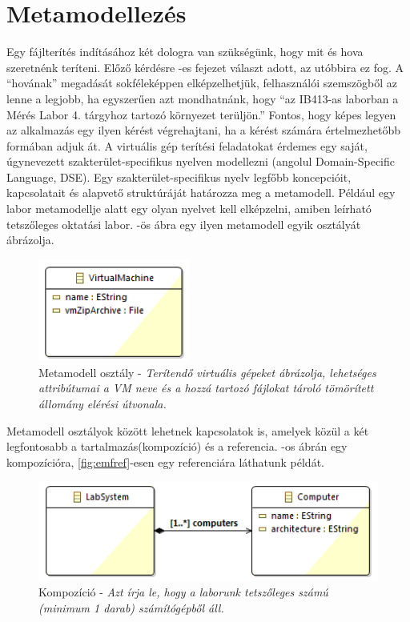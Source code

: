 \section{Metamodellezés}
Egy fájlterítés indításához két dologra van szükségünk, hogy mit és hova szeretnénk teríteni. Előző kérdésre -es fejezet választ adott, az utóbbira ez fog. A ``hovának'' megadását sokféleképpen elképzelhetjük,  felhasználói szemszögből az lenne a legjobb, ha egyszerűen azt mondhatnánk, hogy ``az IB413-as laborban a Mérés Labor 4. tárgyhoz tartozó környezet terüljön.'' Fontos, hogy képes legyen az alkalmazás egy ilyen kérést végrehajtani, ha a kérést számára értelmezhetőbb formában adjuk át. 
A virtuális gép terítési feladatokat érdemes egy saját, úgynevezett szakterület-specifikus nyelven modellezni (angolul Domain-Specific Language, DSE). Egy szakterület-specifikus nyelv legfőbb koncepcióit, kapcsolatait és alapvető struktúráját határozza meg a metamodell. Például egy labor metamodellje alatt egy olyan nyelvet kell elképzelni, amiben leírható tetszőleges oktatási labor. -ös ábra egy ilyen metamodell egyik osztályát ábrázolja.

\vspace{0.5cm}

\begin{figure}[ht]
	\centering
	\includegraphics[width=50mm, keepaspectratio]{figures/binf_emf_1.png}
	\caption{Metamodell osztály - \textit{Terítendő virtuális gépeket ábrázolja, lehetséges attribútumai a VM neve és a hozzá tartozó fájlokat tároló tömörített állomány elérési útvonala.}}
	\label{fig:emfobj}
\end{figure}

Metamodell osztályok között lehetnek kapcsolatok is, amelyek közül a két legfontosabb a tartalmazás(kompozíció) és a referencia. -os ábrán egy kompozícióra, \ref{fig:emfref}-esen egy referenciára láthatunk példát.

\vspace{0.5cm}

\begin{figure}[ht!]
	\centering
	\includegraphics[width=115mm, keepaspectratio]{figures/binf_emf_2.png}
	\caption{Kompozíció - \textit{Azt írja le, hogy a laborunk tetszőleges számú (minimum 1 darab) számítógépből áll.}}
	\label{fig:emfcomp}
\end{figure}

